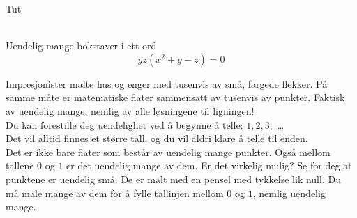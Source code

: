 \documentclass[no]{./../../common/SurferDesc}%
\begin{document}
\footnotesize


\begin{surferPage}
  \begin{surferTitle}Tut\end{surferTitle}   \\
Uendelig mange bokstaver i ett ord\\
\smallskip
\[y z (x^2	+ y - z)	= 0\]

\vspace{0.3cm}
Impresjonister malte hus og enger med tusenvis av små, fargede flekker. På samme måte er matematiske flater sammensatt av tusenvis av punkter. Faktisk av uendelig mange, nemlig av alle løsningene til ligningen! \\
\vspace{0.3cm}
Du kan forestille deg uendelighet ved å begynne å telle:  $1, 2, 3,$ \dots\\
Det vil alltid finnes et større tall, og du vil aldri klare å telle til enden.\\
\vspace{0.3cm}
Det er ikke bare flater som består av uendelig mange punkter. Også mellom tallene $0$ og $1$ er det uendelig mange av dem. Er det virkelig mulig? Se for deg at punktene er uendelig små. De er malt med en pensel med tykkelse lik null. Du må male mange av dem for å fylle tallinjen mellom $0$ og $1$, nemlig uendelig mange.



  \begin{surferText}
     \end{surferText}
\end{surferPage}
\end{document}
